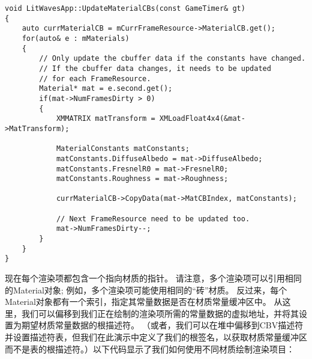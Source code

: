 \begin{lstlisting}
void LitWavesApp::UpdateMaterialCBs(const GameTimer& gt)
{
    auto currMaterialCB = mCurrFrameResource->MaterialCB.get();
    for(auto& e : mMaterials)
    {
        // Only update the cbuffer data if the constants have changed.  
        // If the cbuffer data changes, it needs to be updated 
        // for each FrameResource.
        Material* mat = e.second.get();
        if(mat->NumFramesDirty > 0)
        {
            XMMATRIX matTransform = XMLoadFloat4x4(&mat->MatTransform);

            MaterialConstants matConstants;
            matConstants.DiffuseAlbedo = mat->DiffuseAlbedo;
            matConstants.FresnelR0 = mat->FresnelR0;
            matConstants.Roughness = mat->Roughness;

            currMaterialCB->CopyData(mat->MatCBIndex, matConstants);

            // Next FrameResource need to be updated too.
            mat->NumFramesDirty--;
        }
    }
}
\end{lstlisting}

\begin{flushleft}
现在每个渲染项都包含一个指向材质的指针。 请注意，多个渲染项可以引用相同的Material对象; 例如，多个渲染项可能使用相同的“砖”材质。 反过来，每个Material对象都有一个索引，指定其常量数据是否在材质常量缓冲区中。 从这里，我们可以偏移到我们正在绘制的渲染项所需的常量数据的虚拟地址，并将其设置为期望材质常量数据的根描述符。 （或者，我们可以在堆中偏移到CBV描述符并设置描述符表，但我们在此演示中定义了我们的根签名，以获取材质常量缓冲区而不是表的根描述符。）以下代码显示了我们如何使用不同材质绘制渲染项目：\\
\end{flushleft}

